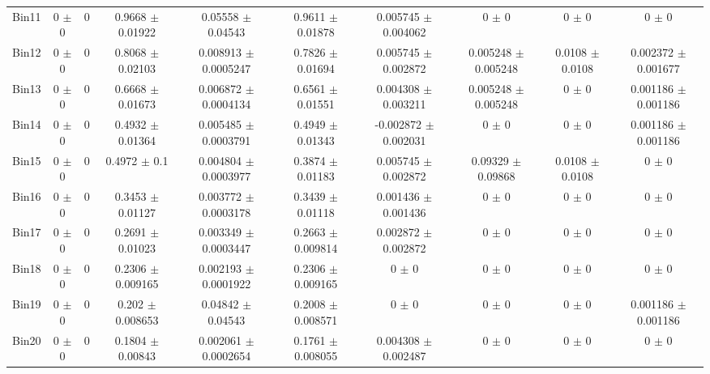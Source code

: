 \begin{tabular}{@{\extracolsep{4pt}}lccccccccc@{}}
     Bin11 & 0 $\pm$ 0 & 0 & 0.9668 $\pm$ 0.01922 & 0.05558 $\pm$ 0.04543 & 0.9611 $\pm$ 0.01878 & 0.005745 $\pm$ 0.004062 & 0 $\pm$ 0 & 0 $\pm$ 0 & 0 $\pm$ 0 \\ 
     Bin12 & 0 $\pm$ 0 & 0 & 0.8068 $\pm$ 0.02103 & 0.008913 $\pm$ 0.0005247 & 0.7826 $\pm$ 0.01694 & 0.005745 $\pm$ 0.002872 & 0.005248 $\pm$ 0.005248 & 0.0108 $\pm$ 0.0108 & 0.002372 $\pm$ 0.001677 \\ 
     Bin13 & 0 $\pm$ 0 & 0 & 0.6668 $\pm$ 0.01673 & 0.006872 $\pm$ 0.0004134 & 0.6561 $\pm$ 0.01551 & 0.004308 $\pm$ 0.003211 & 0.005248 $\pm$ 0.005248 & 0 $\pm$ 0 & 0.001186 $\pm$ 0.001186 \\ 
     Bin14 & 0 $\pm$ 0 & 0 & 0.4932 $\pm$ 0.01364 & 0.005485 $\pm$ 0.0003791 & 0.4949 $\pm$ 0.01343 & -0.002872 $\pm$ 0.002031 & 0 $\pm$ 0 & 0 $\pm$ 0 & 0.001186 $\pm$ 0.001186 \\ 
     Bin15 & 0 $\pm$ 0 & 0 & 0.4972 $\pm$ 0.1 & 0.004804 $\pm$ 0.0003977 & 0.3874 $\pm$ 0.01183 & 0.005745 $\pm$ 0.002872 & 0.09329 $\pm$ 0.09868 & 0.0108 $\pm$ 0.0108 & 0 $\pm$ 0 \\ 
     Bin16 & 0 $\pm$ 0 & 0 & 0.3453 $\pm$ 0.01127 & 0.003772 $\pm$ 0.0003178 & 0.3439 $\pm$ 0.01118 & 0.001436 $\pm$ 0.001436 & 0 $\pm$ 0 & 0 $\pm$ 0 & 0 $\pm$ 0 \\ 
     Bin17 & 0 $\pm$ 0 & 0 & 0.2691 $\pm$ 0.01023 & 0.003349 $\pm$ 0.0003447 & 0.2663 $\pm$ 0.009814 & 0.002872 $\pm$ 0.002872 & 0 $\pm$ 0 & 0 $\pm$ 0 & 0 $\pm$ 0 \\ 
     Bin18 & 0 $\pm$ 0 & 0 & 0.2306 $\pm$ 0.009165 & 0.002193 $\pm$ 0.0001922 & 0.2306 $\pm$ 0.009165 & 0 $\pm$ 0 & 0 $\pm$ 0 & 0 $\pm$ 0 & 0 $\pm$ 0 \\ 
     Bin19 & 0 $\pm$ 0 & 0 & 0.202 $\pm$ 0.008653 & 0.04842 $\pm$ 0.04543 & 0.2008 $\pm$ 0.008571 & 0 $\pm$ 0 & 0 $\pm$ 0 & 0 $\pm$ 0 & 0.001186 $\pm$ 0.001186 \\ 
     Bin20 & 0 $\pm$ 0 & 0 & 0.1804 $\pm$ 0.00843 & 0.002061 $\pm$ 0.0002654 & 0.1761 $\pm$ 0.008055 & 0.004308 $\pm$ 0.002487 & 0 $\pm$ 0 & 0 $\pm$ 0 & 0 $\pm$ 0 \\ 
\hline\hline
  \end{tabular}
